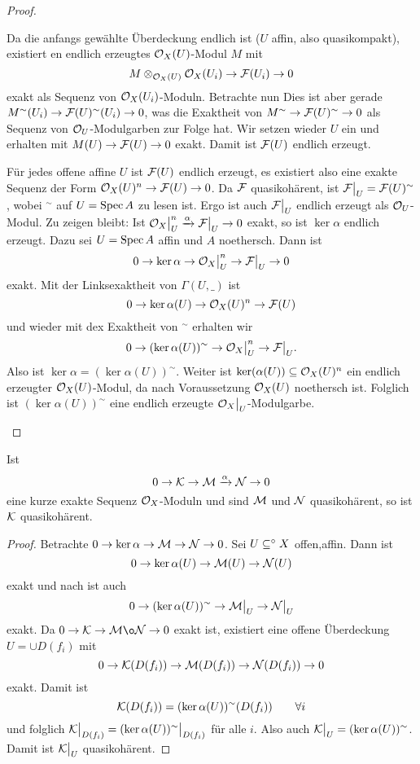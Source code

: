 \begin{proof}
\begin{description mathquote}
        Da die anfangs gewählte Überdeckung \obda endlich ist 
        ($U$ affin, also quasikompakt), existiert en endlich erzeugtes
        $\O_X(U)$-Modul $M$ mit
        \[ M\otimes_{\O_X(U)} \O_X(U_i) \to \F(U_i) \to 0\]
        exakt als Sequenz von $\O_X(U_i)$-Moduln. Betrachte nun 
        Dies ist aber gerade
        $M^\sim(U_i) \to \F(U)^\sim(U_i) \to 0$,
        was die Exaktheit von
        $M^\sim \to \F(U)^\sim \to 0$ als Sequenz von $\O_U$-Modulgarben
        zur Folge hat. Wir setzen wieder $U$ ein und erhalten mit
        $M(U) \to \F(U) \to 0$ exakt.
        Damit ist $\F(U)$ endlich erzeugt.
      \item[\text{(iii)}\Rightarrow\text{(i)}]
        Für jedes offene affine $U$ ist $\F(U)$ endlich erzeugt,
        es existiert also eine exakte Sequenz der Form 
        $\O_X(U)^n \to \F(U) \to 0$. Da $\F$ quasikohärent, ist 
        $\F\rest U = \F(U)^\sim$, wobei  $^\sim$ auf $U = \Spec A$ zu lesen
        ist. Ergo ist auch $\F\rest U$ endlich erzeugt als $\O_U$-Modul.
        Zu zeigen bleibt: Ist $\O_X\rest U ^n \xto\alpha \F\rest U \to 0$ 
        exakt, so ist $\ker \alpha$ endlich erzeugt. Dazu sei
        \obda $U = \Spec A$ affin und $A$ noethersch. Dann
        ist
        \[0\to \ker\alpha\to \O_X\rest U^n \to \F\rest U \to 0\]
        exakt. Mit der Linksexaktheit von $\Gamma(U,\_)$ ist
        \[0\to \ker\alpha(U) \to \O_X(U)^n \to \F(U)\]
        und wieder mit dex Exaktheit von $^\sim$ erhalten wir
        \[0 \to (\ker\alpha(U))^\sim \to \O_X\rest U^n \to \F\rest U.\]
        Also ist $\ker\alpha = (\ker\alpha(U))^\sim$. Weiter
        ist $\ker(\alpha(U)) \subseteq \O_X(U)^n$ ein endlich erzeugter
        $\O_X(U)$-Modul, da nach Voraussetzung $\O_X(U)$ noethersch ist.
        Folglich ist $(\ker\alpha(U))^\sim$ eine endlich erzeugte
        $\O_X\rest U$-Modulgarbe.
    \end{description mathquote}
\end{proof}

\begin{hilfslemma}
    Ist 
    \[0 \to \cal K \to \cal M \xto\alpha \cal N \to 0\]
    eine kurze exakte Sequenz $\O_X$-Moduln und sind $\M$ und $\cal N$ 
    quasikohärent, so ist $\cal K$ quasikohärent.
\end{hilfslemma}
\begin{proof}
    Betrachte $0 \to \ker\alpha \to \M \to \cal N \to 0$. Sei
    $U\osubset X$ offen,affin. Dann ist
    \[0 \to \ker\alpha(U) \to \M(U) \to \cal N(U)\]
    exakt und nach  ist auch
    \[0 \to (\ker \alpha(U))^\sim \to \M\rest U 
        \to \cal N\rest U\]
    exakt. Da $0 \to \cal K\to \M \o \cal N \to 0$ exakt ist, existiert
    eine offene Überdeckung $U = \cup D(f_i )$ mit
    \[ 0 \to \cal K(D(f_i)) \to \M(D(f_i)) \to \cal N(D(f_i)) \to 0\]
    exakt. Damit ist
    \[\cal K(D(f_i)) = (\ker\alpha(U))^\sim (D(f_i))\qquad \forall i\]
    und folglich 
    $\cal K\rest{D(f_i)} = (\ker\alpha(U))^\sim\rest{D(f_i)}$ für alle $i$.
    Also auch $\cal K\rest U =(\ker\alpha(U))^\sim$. Damit ist
    $\cal K\rest U$ quasikohärent.  
\end{proof}

